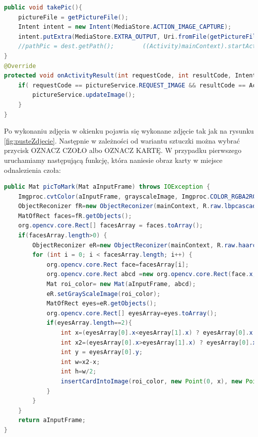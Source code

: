 \documentclass{article}
\numberwithin{equation}{section}
\begin{document}
\begin{lstlisting}[language=Java]
public void takePic(){
    pictureFile = getPictureFile();
    Intent intent = new Intent(MediaStore.ACTION_IMAGE_CAPTURE);
    intent.putExtra(MediaStore.EXTRA_OUTPUT, Uri.fromFile(getPictureFile()));
    //pathPic = dest.getPath();        ((Activity)mainContext).startActivityForResult(intent, REQUEST_IMAGE);
}
@Override
protected void onActivityResult(int requestCode, int resultCode, Intent data) {
    if( requestCode == pictureService.REQUEST_IMAGE && resultCode == Activity.RESULT_OK ){
        pictureService.updateImage();
    }
}
\end{lstlisting}

Po wykonaniu zdjęcia w okienku pojawia się wykonane zdjęcie tak jak na rysunku \ref{fig:pusteZdjecie}. Następnie w zależności od wariantu sztuczki można wybrać przycisk OZNACZ CZOŁO albo OZNACZ KARTĘ. W przypadku pierwszego uruchamiamy następującą funkcję, która naniesie obraz karty w miejsce odnalezienia czoła:

\begin{lstlisting}[language=Java]
public Mat picToMark(Mat aInputFrame) throws IOException {
    Imgproc.cvtColor(aInputFrame, grayscaleImage, Imgproc.COLOR_RGBA2RGB);
    ObjectReconizer fR=new ObjectReconizer(mainContext, R.raw.lbpcascade_frontalface, mainContext.getString(R.string.cascadeFrontalFaceXML), grayscaleImage, 1.3, 3);
    MatOfRect faces=fR.getObjects();
    org.opencv.core.Rect[] facesArray = faces.toArray();
    if(facesArray.length>0) {
        ObjectReconizer eR=new ObjectReconizer(mainContext, R.raw.haarcascade_lefteye_2splits, "haarcascade_lefteye_2splits.xml", grayscaleImage, 1.3, 3);
        for (int i = 0; i < facesArray.length; i++) {
            org.opencv.core.Rect face=facesArray[i];
            org.opencv.core.Rect abcd =new org.opencv.core.Rect(face.x, face.y, face.width, face.height);
            Mat roi_color= new Mat(aInputFrame, abcd);
            eR.setGrayScaleImage(roi_color);
            MatOfRect eyes=eR.getObjects();
            org.opencv.core.Rect[] eyesArray=eyes.toArray();
            if(eyesArray.length==2){
                int x=(eyesArray[0].x<eyesArray[1].x) ? eyesArray[0].x:eyesArray[1].x;
                int x2=(eyesArray[0].x>eyesArray[1].x) ? eyesArray[0].x+eyesArray[0].width:eyesArray[1].x+eyesArray[1].width;
                int y = eyesArray[0].y;
                int w=x2-x;
                int h=w/2;
                insertCardIntoImage(roi_color, new Point(0, x), new Point(h, w+x));
            }
        }
    }
    return aInputFrame;
}
\end{lstlisting}
\end{document}
